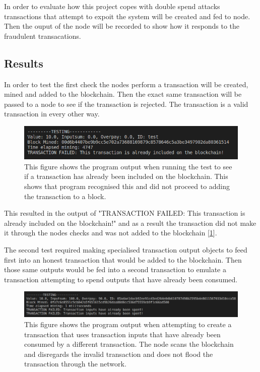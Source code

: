 \documentclass{l4proj}
\begin{document}
In order to evaluate how this project copes with double spend attacks transactions that attempt to expoit the system
will be created and fed to node. Then the ouput of the node will be recorded to show how it responds to the fraudulent
transacations.



\subsection{Results}
In order to test the first check the nodes perform a transaction will be created, mined and added to the blockchain.
Then the exact same transaction will be passed to a node to see if the transaction is rejected. The transaction is
a valid transaction in every other way.

\begin{figure}[!ht]
    \centering
    \includegraphics[width=1\linewidth]{images/check1.png}    
    \caption
    {
        This figure shows the program output when running the test to see if a transaction has already been included
        on the blockchain. This shows that program recognised this and did not proceed to adding the transaction to a 
        block.
    }
    \label{fig:check1} 
\end{figure}

This resulted in the output of "TRANSACTION FAILED: This transaction is already included on the blockchain!" and as
a result the transaction did not make it through the nodes checks and was not added to the blockchain [\ref{fig:check1}].

The second test required making specialised transaction output objects to feed first into an honest transaction that
would be added to the blockchain. Then those same outputs would be fed into a second transaction to emulate a
transaction attempting to spend outputs that have already been consumed.

\begin{figure}[!ht]
    \centering
    \includegraphics[width=1\linewidth]{images/inputsspent.png}    
    \caption
    {
        This figure shows the program output when attempting to create a transaction that uses transaction inputs
        that have already been consumed by a different transaction. The node scans the blockchain and disregards the
        invalid transaction and does not flood the transaction through the network.
    }
    \label{fig:inputsspent}
\end{figure}
\end{document}
